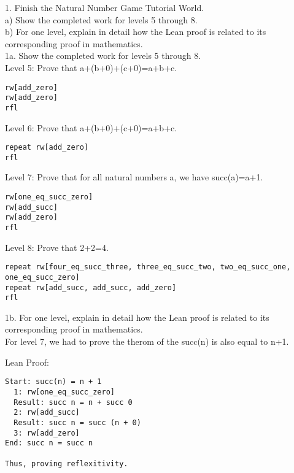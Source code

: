 \documentclass{article}
\theoremstyle{theorem}
\theoremstyle{definition}
\theoremstyle{remark}
\begin{document}
1. Finish the Natural Number Game Tutorial World. \\
\hspace*{2em}a) Show the completed work for levels 5 through 8. \\
\hspace*{2em}b) For one level, explain in detail how the Lean proof is related to its corresponding proof in mathematics. \\

1a. Show the completed work for levels 5 through 8. \\
Level 5: Prove that a+(b+0)+(c+0)=a+b+c.
\begin{lstlisting}
rw[add_zero]
rw[add_zero]
rfl
\end{lstlisting}

Level 6: Prove that a+(b+0)+(c+0)=a+b+c.
\begin{lstlisting}
repeat rw[add_zero]
rfl
\end{lstlisting}

Level 7: Prove that for all natural numbers a, we have succ(a)=a+1.
\begin{lstlisting}
rw[one_eq_succ_zero]
rw[add_succ]
rw[add_zero]
rfl
\end{lstlisting}

Level 8: Prove that 2+2=4.
\begin{lstlisting}
repeat rw[four_eq_succ_three, three_eq_succ_two, two_eq_succ_one, one_eq_succ_zero]
repeat rw[add_succ, add_succ, add_zero]
rfl
\end{lstlisting}

1b. For one level, explain in detail how the Lean proof is related to its corresponding proof in mathematics. \\
For level 7, we had to prove the therom of the succ(n) is also equal to n+1. 

Lean Proof:
\begin{lstlisting}
Start: succ(n) = n + 1
  1: rw[one_eq_succ_zero]
  Result: succ n = n + succ 0
  2: rw[add_succ]
  Result: succ n = succ (n + 0)
  3: rw[add_zero]
End: succ n = succ n

Thus, proving reflexitivity. 
\end{lstlisting}
\end{document}
